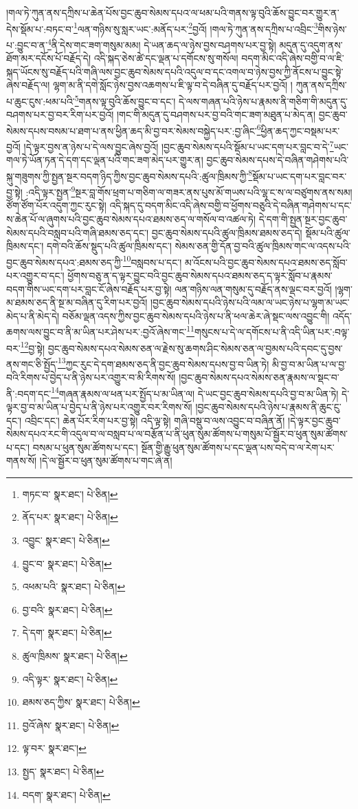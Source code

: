 །གལ་ཏེ་ཀུན་ནས་དཀྲིས་པ་ཆེན་པོས་བྱང་ཆུབ་སེམས་དཔའ་ལ་ཕམ་པའི་གནས་ལྟ་བུའི་ཆོས་བྱུང་བར་གྱུར་ན་དེས་སྡོམ་པ་:བཏང་བ་\footnote{གཏང་བ་  སྣར་ཐང་།  པེ་ཅིན། }ལན་གཉིས་སུ་སླར་ཡང་:མནོད་པར་\footnote{ནོད་པར་  སྣར་ཐང་།  པེ་ཅིན། }བྱའོ། །གལ་ཏེ་ཀུན་ནས་དཀྲིས་པ་འབྲིང་\footnote{འབྱུང་  སྣར་ཐང་།  པེ་ཅིན། }གིས་ཉེས་པ་:བྱུང་བ་ན་\footnote{བྱུང་བ་  སྣར་ཐང་།  པེ་ཅིན། }ནི་དེས་གང་ཟག་གསུམ་མམ། དེ་ཡན་ཆད་ལ་ཉེས་བྱས་བཤགས་པར་བྱ་སྟེ། མདུན་དུ་འདུག་ནས་ཐོག་མར་དངོས་པོ་བརྗོད་དེ། འདི་སྐད་ཅེས་ཚེ་དང་ལྡན་པ་དགོངས་སུ་གསོལ། བདག་མིང་འདི་ཞེས་བགྱི་བ་ལ་ཇི་སྐད་ཡོངས་སུ་བརྗོད་པའི་གཞི་ལས་བྱང་ཆུབ་སེམས་དཔའི་འདུལ་བ་དང་འགལ་བ་ཉེས་བྱས་ཀྱི་ནོངས་པ་བྱུང་སྟེ་ཞེས་བརྗོད་ལ། ལྷག་མ་ནི་དགེ་སློང་ཉེས་བྱས་འཆགས་པ་ཇི་ལྟ་བ་དེ་བཞིན་དུ་བརྗོད་པར་བྱའོ། །
ཀུན་ནས་དཀྲིས་པ་ཆུང་ངུས་:ཕམ་པའི་\footnote{འཕམ་པའི་  སྣར་ཐང་།  པེ་ཅིན། }གནས་ལྟ་བུའི་ཆོས་བྱུང་བ་དང་། དེ་ལས་གཞན་པའི་ཉེས་པ་རྣམས་ནི་གཅིག་གི་མདུན་དུ་བཤགས་པར་བྱ་བར་རིག་པར་བྱའོ། །གང་གི་མདུན་དུ་བཤགས་པར་བྱ་བའི་གང་ཟག་མཐུན་པ་མེད་ན། བྱང་ཆུབ་སེམས་དཔས་བསམ་པ་ཐག་པ་ནས་ཕྱིན་ཆད་མི་བྱ་བར་སེམས་བསྐྱེད་པར་:བྱ་ཞིང་\footnote{བྱ་བའི་  སྣར་ཐང་།  པེ་ཅིན། }ཕྱིན་ཆད་ཀྱང་བསྡམ་པར་བྱའོ། །དེ་ལྟར་བྱས་ན་ཉེས་པ་དེ་ལས་བྱུང་ཞེས་བྱའོ། །བྱང་ཆུབ་སེམས་དཔའི་སྡོམ་པ་ཡང་དག་པར་བླང་བ་དེ་\footnote{དེ་དག་  སྣར་ཐང་།  པེ་ཅིན། }ཡང་གལ་ཏེ་ཡོན་ཏན་དེ་དག་དང་ལྡན་པའི་གང་ཟག་མེད་པར་གྱུར་ན། བྱང་ཆུབ་སེམས་དཔས་དེ་བཞིན་གཤེགས་པའི་སྐུ་གཟུགས་ཀྱི་སྤྱན་སྔར་བདག་ཉིད་ཀྱིས་བྱང་ཆུབ་སེམས་དཔའི་:ཚུལ་ཁྲིམས་ཀྱི་\footnote{ཚུལ་ཁྲིམས་  སྣར་ཐང་།  པེ་ཅིན། }སྡོམ་པ་ཡང་དག་པར་བླང་བར་བྱ་སྟེ། :འདི་ལྟར་སྤྱན་\footnote{འདི་ལྟར་  སྣར་ཐང་།  པེ་ཅིན། }སྔར་བླ་གོས་ཕྲག་པ་གཅིག་ལ་གཟར་ནས་པུས་མོ་གཡས་པའི་ལྷ་ང་ས་ལ་བཙུགས་ནས་སམ། ཙོག་ཙོག་པོར་འདུག་ཀྱང་རུང་སྟེ། འདི་སྐད་དུ་བདག་མིང་འདི་ཞེས་བགྱི་བ་ཕྱོགས་བཅུའི་དེ་བཞིན་གཤེགས་པ་དང་ས་ཆེན་པོ་ལ་ཞུགས་པའི་བྱང་ཆུབ་སེམས་དཔའ་ཐམས་ཅད་ལ་གསོལ་བ་འཚལ་ཏེ། དེ་དག་གི་སྤྱན་སྔར་བྱང་ཆུབ་སེམས་དཔའི་བསླབ་པའི་གཞི་ཐམས་ཅད་དང་། བྱང་ཆུབ་སེམས་དཔའི་ཚུལ་ཁྲིམས་ཐམས་ཅད་དེ། སྡོམ་པའི་ཚུལ་ཁྲིམས་དང་། དགེ་བའི་ཆོས་སྡུད་པའི་ཚུལ་ཁྲིམས་དང་། སེམས་ཅན་གྱི་དོན་བྱ་བའི་ཚུལ་ཁྲིམས་གང་ལ་འདས་པའི་བྱང་ཆུབ་སེམས་དཔའ་:ཐམས་ཅད་ཀྱི་\footnote{ཐམས་ཅད་ཀྱིས་  སྣར་ཐང་།  པེ་ཅིན། }བསླབས་པ་དང་། མ་འོངས་པའི་བྱང་ཆུབ་སེམས་དཔའ་ཐམས་ཅད་སློབ་པར་འགྱུར་བ་དང་། ཕྱོགས་བཅུ་ན་ད་ལྟར་བྱུང་བའི་བྱང་ཆུབ་སེམས་དཔའ་ཐམས་ཅད་ད་ལྟར་སློབ་པ་རྣམས་བདག་གིས་ཡང་དག་པར་བླང་ངོ་ཞེས་བརྗོད་པར་བྱ་སྟེ། ལན་གཉིས་ལན་གསུམ་དུ་བརྗོད་ནས་ལྡང་བར་བྱའོ། །ལྷག་མ་ཐམས་ཅད་ནི་སྔ་མ་བཞིན་དུ་རིག་པར་བྱའོ། །བྱང་ཆུབ་སེམས་དཔའི་ཉེས་པའི་ལམ་ལ་ཡང་ཉེས་པ་ལྷག་མ་ཡང་མེད་པ་ནི་མེད་དེ། བཅོམ་ལྡན་འདས་ཀྱིས་བྱང་ཆུབ་སེམས་དཔའི་ཉེས་པ་ནི་ཕལ་ཆེར་ཞེ་སྡང་ལས་འབྱུང་གི། འདོད་ཆགས་ལས་བྱུང་བ་ནི་མ་ཡིན་པར་ཤེས་པར་:བྱའོ་ཞེས་གང་\footnote{བྱའོ་ཞེས་  སྣར་ཐང་།  པེ་ཅིན། }གསུངས་པ་དེ་ལ་དགོངས་པ་ནི་འདི་ཡིན་པར་:བལྟ་བར་\footnote{ལྟ་བར་  སྣར་ཐང་། }བྱ་སྟེ། བྱང་ཆུབ་སེམས་དཔའ་སེམས་ཅན་ལ་རྗེས་སུ་ཆགས་ཤིང་སེམས་ཅན་ལ་བྱམས་པའི་དབང་དུ་བྱས་ནས་གང་ཅི་སྤྱོད་\footnote{སྤྱད་  སྣར་ཐང་།  པེ་ཅིན། }ཀྱང་རུང་དེ་དག་ཐམས་ཅད་ནི་བྱང་ཆུབ་སེམས་དཔས་བྱ་བ་ཡིན་ཏེ། མི་བྱ་བ་མ་ཡིན་པ་ལ་བྱ་བའི་རིགས་པ་བྱེད་པ་ནི་ཉེས་པར་འགྱུར་བ་མི་རིགས་སོ། །བྱང་ཆུབ་སེམས་དཔའ་སེམས་ཅན་རྣམས་ལ་སྡང་བ་ནི་:བདག་དང་\footnote{བདག་  སྣར་ཐང་།  པེ་ཅིན། }གཞན་རྣམས་ལ་ཕན་པར་སྤྱོད་པ་མ་ཡིན་ལ། དེ་ཡང་བྱང་ཆུབ་སེམས་དཔའི་བྱ་བ་མ་ཡིན་ཏེ། དེ་ལྟར་བྱ་བ་མ་ཡིན་པ་བྱེད་པ་ནི་ཉེས་པར་འགྱུར་བར་རིགས་སོ། །བྱང་ཆུབ་སེམས་དཔའི་ཉེས་པ་རྣམས་ནི་ཆུང་ངུ་དང་། འབྲིང་དང་། ཆེན་པོར་རིག་པར་བྱ་སྟེ། འདི་ལྟ་སྟེ། གཞི་བསྡུ་བ་ལས་འབྱུང་བ་བཞིན་ནོ། །དེ་ལྟར་བྱང་ཆུབ་སེམས་དཔའ་རང་གི་འདུལ་བ་ལ་བསླབ་པ་ལ་བརྩོན་པ་ནི་ཕུན་སུམ་ཚོགས་པ་གསུམ་པོ་སྦྱོར་བ་ཕུན་སུམ་ཚོགས་པ་དང་། བསམ་པ་ཕུན་སུམ་ཚོགས་པ་དང་། སྔོན་གྱི་རྒྱུ་ཕུན་སུམ་ཚོགས་པ་དང་ལྡན་པས་བདེ་བ་ལ་རེག་པར་གནས་སོ། །དེ་ལ་སྦྱོར་བ་ཕུན་སུམ་ཚོགས་པ་གང་ཞེ་ན། 